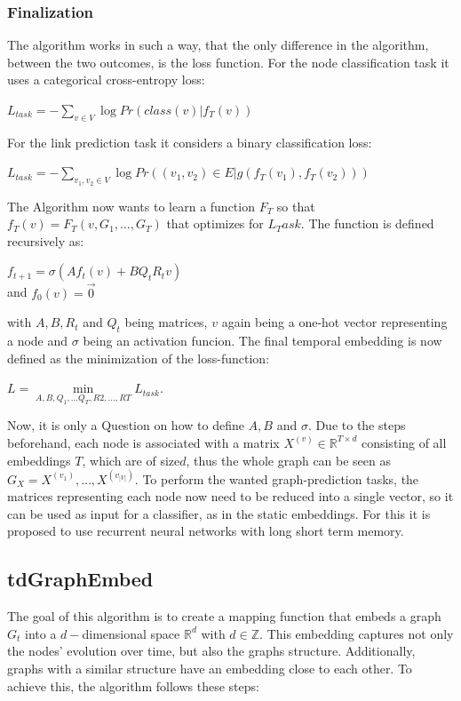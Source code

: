 \documentclass[sigconf]{acmart}
\begin{document}
\subsubsection{Finalization}
The algorithm works in such a way, that the only difference in the algorithm, between the two outcomes, is the loss function. 
For the node classification task it uses a categorical cross-entropy loss:
\begin{center}
 \(L_{task} = -\sum\limits_{v\in V} \log {Pr(class(v)|f_T(v))}\)
\end{center}
For the link prediction task it considers a binary classification loss: 
\begin{center}
  \(L_{task} = -\sum\limits_{v_1, v_2 \in V} \log{Pr((v_1,v_2)\in E | g(f_T(v_1), f_T(v_2)))}\)
\end{center}
The Algorithm now wants to learn a function \(F_T\) so that \(f_T(v) = F_T(v,G_1, \ldots, G_T)\) that optimizes for \(L_Task\).
The function is defined recursively as: 
\begin{center}
  \(f_{t+1} = \sigma(Af_t(v) + BQ_tR_tv)\) \\
  and \(f_0(v) = \vec{0}\)
\end{center}
with \(A,B,R_t\) and \(Q_t\) being matrices, \(v\) again being a one-hot vector representing a node and \(\sigma\) being an activation funcion.
The final temporal embedding is now defined as the minimization of the loss-function:
\begin{center}
  \( L = \min\limits_{A,B,Q_1, \ldots Q_T,R2, \ldots, RT} L_{task}\).
\end{center}
Now, it is only a Question on how to define \(A,B\) and \(\sigma\).
Due to the steps beforehand, each node is associated with a matrix \(X^{(v)} \in \mathbb{R}^{T \times d}\) consisting of 
all embeddings \(T\), which are of size\(d\), thus the whole graph can be seen as \(G_X = X^{(v_1)},\ldots, X^{(v_{|V|})}\).
To perform the wanted graph-prediction tasks, the matrices representing each node now need to be reduced into a single vector, so it can be used as input for a classifier, as in the static embeddings.
For this it is proposed to use recurrent neural networks with long short term memory.
\cite{Singer.2019}

\subsection{tdGraphEmbed}
The goal of this algorithm is to create a mapping function that embeds a graph \(G_t\) into a \(d-\)dimensional space \(\mathbb{R}^d\) with \(d \in \mathbb{Z}\).
This embedding captures not only the nodes' evolution over time, but also the graphs structure. Additionally, graphs with a similar structure have an embedding close to each other.
To achieve this, the algorithm follows these steps:
\end{document}

